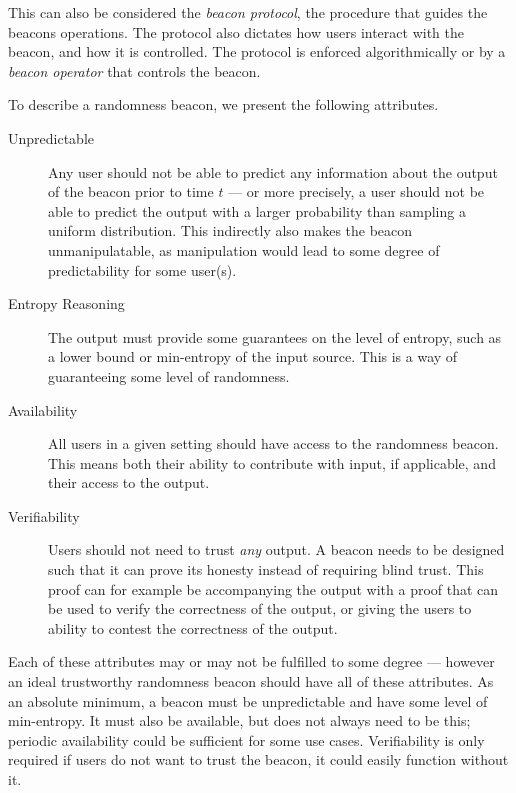 This can also be considered the \emph{beacon protocol}, the procedure that guides the beacons operations. The protocol also dictates how users interact with the beacon, and how it is controlled. The protocol is enforced algorithmically or by a \emph{beacon operator} that controls the beacon.


To describe a randomness beacon, we present the following attributes.

\begin{description}
    \item[Unpredictable]
        Any user should not be able to predict any information about the output of the beacon prior to time $t$ --- or more precisely, a user should not be able to predict the output with a larger probability than sampling a uniform distribution.
        This indirectly also makes the beacon unmanipulatable, as manipulation would lead to some degree of predictability for some user(s).
    \item[Entropy Reasoning]
		The output must provide some guarantees on the level of entropy, such as a lower bound or min-entropy of the input source.
        This is a way of guaranteeing some level of randomness.
    \item[Availability]
        All users in a given setting should have access to the randomness beacon.
        This means both their ability to contribute with input, if applicable, and their access to the output.
    \item[Verifiability]
        Users should not need to trust \emph{any} output.
        A beacon needs to be designed such that it can prove its honesty instead of requiring blind trust.
        This proof can for example be accompanying the output with a proof that can be used to verify the correctness of the output, or giving the users to ability to contest the correctness of the output.
\end{description}

Each of these attributes may or may not be fulfilled to some degree --- however an ideal trustworthy randomness beacon should have all of these attributes. As an absolute minimum, a beacon must be unpredictable and have some level of min-entropy. It must also be available, but does not always need to be this; periodic availability could be sufficient for some use cases. Verifiability is only required if users do not want to trust the beacon, it could easily function without it.

